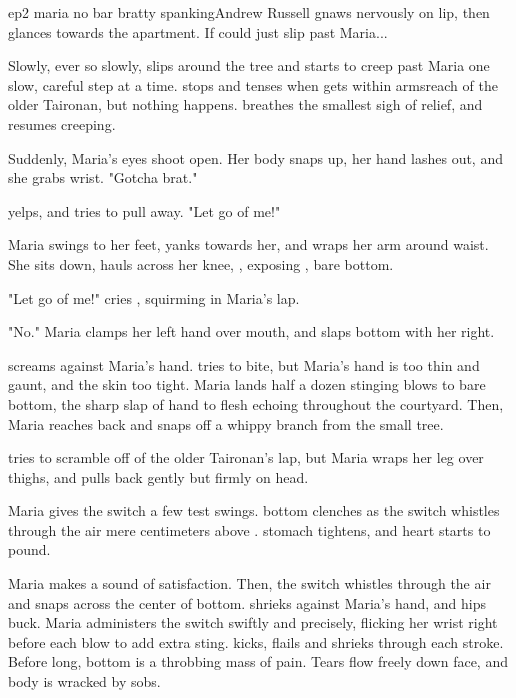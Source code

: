\documentclass{book}
\begin{document}
\begin{childnode}{ep2 maria no bar bratty spanking}{Andrew Russell}
    \name{} gnaws nervously on \hisher{} lip, then glances towards the apartment. If \heshe{} could just slip past Maria...

    Slowly, ever so slowly, \name{} slips around the tree and starts to creep past Maria one slow, careful step at a time. \HeShe{} stops and tenses when \heshe{} gets within armsreach of the older Taironan, but nothing happens. \HeShe{} breathes the smallest sigh of 
    relief, and resumes \hisher{} creeping.
    
    Suddenly, Maria's eyes shoot open. Her body snaps up, her hand lashes out, and she grabs \names{} wrist. "Gotcha brat."

    \name{} yelps, and tries to pull away. "Let go of me!"

    Maria swings to her feet, yanks \name{} towards her, and wraps her arm around \names{} waist. She sits down, hauls \name{} across her knee, 
    , exposing \names{}
    \muscleadj{}, \bumadj{} bare bottom. 
    
    "Let go of me!" cries \name{}, squirming in Maria's lap.

    "No." Maria clamps her left hand over \names{} mouth, and slaps \names{} bottom with her right. 

    \name{} screams against Maria's hand. \HeShe{} tries to bite, but Maria's hand is too thin and gaunt, and the skin too tight. Maria lands half a dozen stinging
    blows to \names{} bare bottom, the sharp slap of hand to flesh echoing throughout the courtyard.
    Then, Maria reaches back and snaps off a whippy branch from the small tree.

    \name{} tries to scramble off of the older Taironan's lap, but Maria wraps her leg over \names{} thighs, and pulls back gently but firmly on \names{} head.

    Maria gives the switch a few test swings. \names{} bottom clenches as the switch whistles through the air mere centimeters above \himher{}. \HisHer{} stomach tightens, and \hisher{} heart
    starts to pound.

    Maria makes a sound of satisfaction. Then, the switch whistles through the air and snaps across the center of \names{} \bumadj{} bottom. \name{} shrieks against Maria's hand, and \hisher{} hips buck. Maria
    administers the switch swiftly and precisely, flicking her wrist right before each blow to add extra sting. \name{} kicks, flails and shrieks through 
    each stroke. Before long, \hisher{} bottom is a throbbing mass of pain. Tears flow freely down \hisher{} face, and \hisher{} body is wracked by sobs.


\end{childnode}
\end{document}
